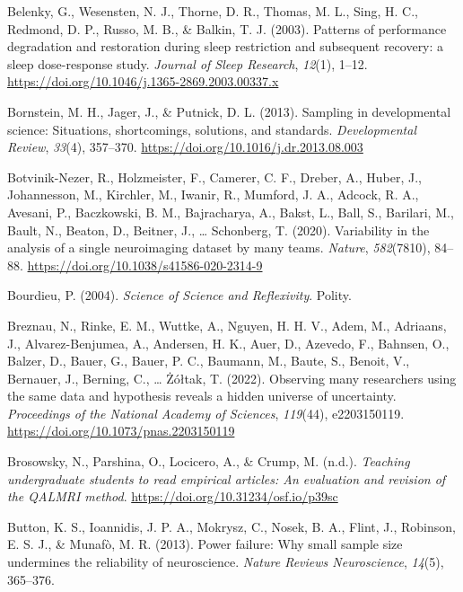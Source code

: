 \documentclass[
  letterpaper,
  DIV=11,
  numbers=noendperiod]{scrreprt}
\newlength{\cslhangindent}
\newlength{\cslentryspacingunit} %
\newenvironment{CSLReferences}[2] %
 {%
  \setlength{\parindent}{0pt}
  \ifodd #1
  \let\oldpar\par
  \def\par{\hangindent=\cslhangindent\oldpar}
  \fi
  \setlength{\parskip}{#2\cslentryspacingunit}
 }%
 {}
\begin{document}
\begin{CSLReferences}{1}{0}
\leavevmode{}%
Belenky, G., Wesensten, N. J., Thorne, D. R., Thomas, M. L., Sing, H.
C., Redmond, D. P., Russo, M. B., \& Balkin, T. J. (2003). Patterns of
performance degradation and restoration during sleep restriction and
subsequent recovery: a sleep dose-response study. \emph{Journal of Sleep
Research}, \emph{12}(1), 1--12.
\url{https://doi.org/10.1046/j.1365-2869.2003.00337.x}

\leavevmode{}%
Bornstein, M. H., Jager, J., \& Putnick, D. L. (2013). Sampling in
developmental science: Situations, shortcomings, solutions, and
standards. \emph{Developmental Review}, \emph{33}(4), 357--370.
\url{https://doi.org/10.1016/j.dr.2013.08.003}

\leavevmode{}%
Botvinik-Nezer, R., Holzmeister, F., Camerer, C. F., Dreber, A., Huber,
J., Johannesson, M., Kirchler, M., Iwanir, R., Mumford, J. A., Adcock,
R. A., Avesani, P., Baczkowski, B. M., Bajracharya, A., Bakst, L., Ball,
S., Barilari, M., Bault, N., Beaton, D., Beitner, J., \ldots{}
Schonberg, T. (2020). Variability in the analysis of a single
neuroimaging dataset by many teams. \emph{Nature}, \emph{582}(7810),
84--88. \url{https://doi.org/10.1038/s41586-020-2314-9}

\leavevmode{}%
Bourdieu, P. (2004). \emph{Science of Science and Reflexivity}. Polity.

\leavevmode{}%
Breznau, N., Rinke, E. M., Wuttke, A., Nguyen, H. H. V., Adem, M.,
Adriaans, J., Alvarez-Benjumea, A., Andersen, H. K., Auer, D., Azevedo,
F., Bahnsen, O., Balzer, D., Bauer, G., Bauer, P. C., Baumann, M.,
Baute, S., Benoit, V., Bernauer, J., Berning, C., \ldots{} Żółtak, T.
(2022). Observing many researchers using the same data and hypothesis
reveals a hidden universe of uncertainty. \emph{Proceedings of the
National Academy of Sciences}, \emph{119}(44), e2203150119.
\url{https://doi.org/10.1073/pnas.2203150119}

\leavevmode{}%
Brosowsky, N., Parshina, O., Locicero, A., \& Crump, M. (n.d.).
\emph{Teaching undergraduate students to read empirical articles: An
evaluation and revision of the QALMRI method}.
\url{https://doi.org/10.31234/osf.io/p39sc}

\leavevmode{}%
Button, K. S., Ioannidis, J. P. A., Mokrysz, C., Nosek, B. A., Flint,
J., Robinson, E. S. J., \& Munafò, M. R. (2013). Power failure: Why
small sample size undermines the reliability of neuroscience.
\emph{Nature Reviews Neuroscience}, \emph{14}(5), 365--376.


\end{CSLReferences}
\end{document}
